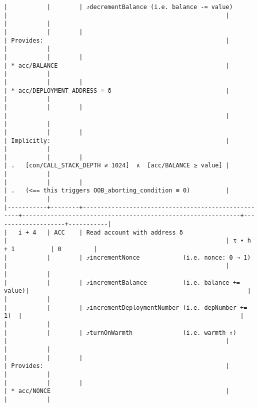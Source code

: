 \documentclass[varwidth=\maxdimen,margin=0.5cm,multi={verbatim}]{standalone}
\begin{document}
\begin{verbatim}
|           |        | ⤴️decrementBalance (i.e. balance -= value)         |                                                             |                    |           |
|           |        |                                                    | Provides:                                                   |                    |           |
|           |        |                                                    | * acc/BALANCE                                               |                    |           |
|           |        |                                                    | * acc/DEPLOYMENT_ADDRESS ≡ δ                                |                    |           |
|           |        |                                                    |                                                             |                    |           |
|           |        |                                                    | Implicitly:                                                 |                    |           |
|           |        |                                                    | .   [con/CALL_STACK_DEPTH ≠ 1024]  ∧  [acc/BALANCE ≥ value] |                    |           |
|           |        |                                                    | .   (<== this triggers OOB_aborting_condition ≡ 0)          |                    |           |
|-----------+--------+----------------------------------------------------+-------------------------------------------------------------+--------------------+-----------|
|   i + 4   | ACC    | Read account with address δ                        |                                                             | τ ∙ h + 1          | 0         |
|           |        | ⤴️incrementNonce            (i.e. nonce: 0 → 1)    |                                                             |                    |           |
|           |        | ⤴️incrementBalance          (i.e. balance += value)|                                                             |                    |           |
|           |        | ⤴️incrementDeploymentNumber (i.e. depNumber += 1)  |                                                             |                    |           |
|           |        | ⤴️turnOnWarmth              (i.e. warmth ↑)        |                                                             |                    |           |
|           |        |                                                    | Provides:                                                   |                    |           |
|           |        |                                                    | * acc/NONCE                                                 |                    |           |

\end{verbatim}
\end{document}
